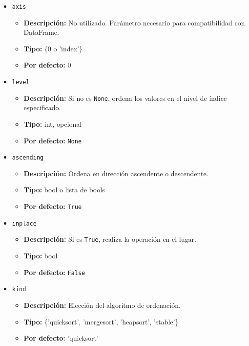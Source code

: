     \begin{itemize}
        \item \texttt{axis}
            \begin{itemize}
                \item \textbf{Descripción:} No utilizado. Parámetro necesario para compatibilidad con DataFrame.
                \item \textbf{Tipo:} \{0 o 'index'\}
                \item \textbf{Por defecto:} 0
            \end{itemize}
        \item \texttt{level}
            \begin{itemize}
                \item \textbf{Descripción:} Si no es \texttt{None}, ordena los valores en el nivel de índice especificado.
                \item \textbf{Tipo:} int, opcional
                \item \textbf{Por defecto:} \texttt{None}
            \end{itemize}
        \item \texttt{ascending}
            \begin{itemize}
                \item \textbf{Descripción:} Ordena en dirección ascendente o descendente.
                \item \textbf{Tipo:} bool o lista de bools
                \item \textbf{Por defecto:} \texttt{True}
            \end{itemize}
        \item \texttt{inplace}
            \begin{itemize}
                \item \textbf{Descripción:} Si es \texttt{True}, realiza la operación en el lugar.
                \item \textbf{Tipo:} bool
                \item \textbf{Por defecto:} \texttt{False}
            \end{itemize}
        \item \texttt{kind}
            \begin{itemize}
                \item \textbf{Descripción:} Elección del algoritmo de ordenación.
                \item \textbf{Tipo:} \{'quicksort', 'mergesort', 'heapsort', 'stable'\}
                \item \textbf{Por defecto:} 'quicksort'

\end{itemize}
\end{itemize}
